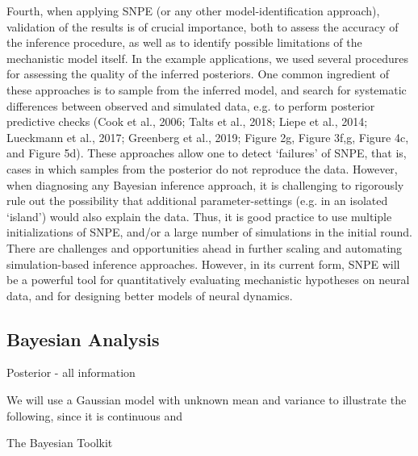 Fourth, when applying SNPE (or any other model-identification approach), validation of the results is of crucial importance, both to assess the accuracy of the inference procedure, as well as to identify possible limitations of the mechanistic model itself. In the example applications, we used several procedures for assessing the quality of the inferred posteriors. One common ingredient of these approaches is to sample from the inferred model, and search for systematic differences between observed and simulated data, e.g. to perform posterior predictive checks (Cook et al., 2006; Talts et al., 2018; Liepe et al., 2014; Lueckmann et al., 2017; Greenberg et al., 2019; Figure 2g, Figure 3f,g, Figure 4c, and Figure 5d). These approaches allow one to detect ‘failures’ of SNPE, that is, cases in which samples from the posterior do not reproduce the data. However, when diagnosing any Bayesian inference approach, it is challenging to rigorously rule out the possibility that additional parameter-settings (e.g. in an isolated ‘island’) would also explain the data. Thus, it is good practice to use multiple initializations of SNPE, and/or a large number of simulations in the initial round. There are challenges and opportunities ahead in further scaling and automating simulation-based inference approaches. However, in its current form, SNPE will be a powerful tool for quantitatively evaluating mechanistic hypotheses on neural data, and for designing better models of neural dynamics.

\subsection{Bayesian Analysis}


Posterior - all information

We will use a Gaussian model with unknown mean and variance to illustrate the following, since it is continuous and

The Bayesian Toolkit

